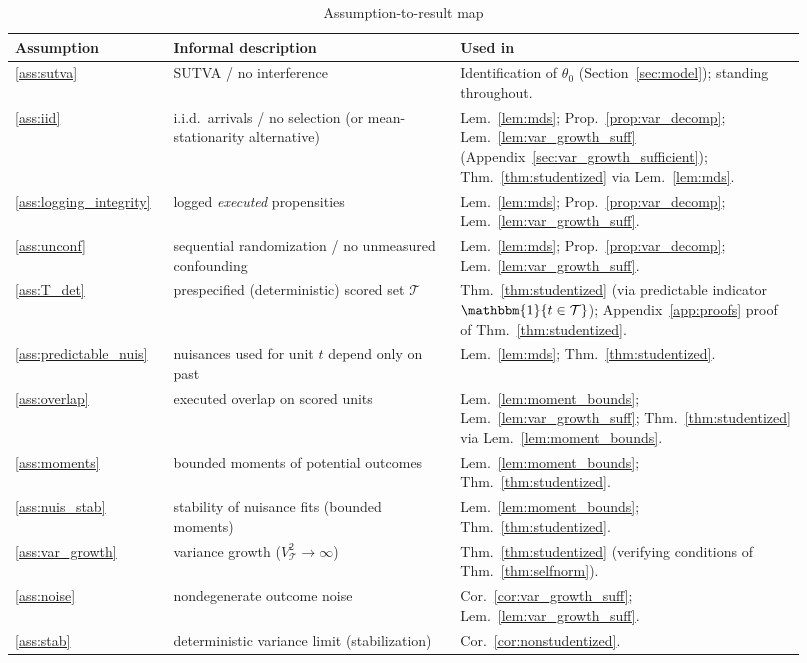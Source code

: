 \documentclass[11pt]{article}
\numberwithin{equation}{section}
\theoremstyle{plain}
\theoremstyle{definition}
\theoremstyle{remark}
\newcommand{\ind}[1]{\mathbbm{1}\{#1\}}
\begin{document}
\begin{table}[t]
\centering
\small
\begin{tabular}{@{}p{0.17\linewidth} p{0.34\linewidth} p{0.41\linewidth}@{}}
\toprule
Assumption & Informal description & Used in \\
\midrule
\ref{ass:sutva} & SUTVA / no interference & Identification of $\theta_0$ (Section~\ref{sec:model}); standing throughout. \\
\ref{ass:iid} & i.i.d.\ arrivals / no selection (or mean-stationarity alternative) & Lem.~\ref{lem:mds}; Prop.~\ref{prop:var_decomp}; Lem.~\ref{lem:var_growth_suff} (Appendix~\ref{sec:var_growth_sufficient}); Thm.~\ref{thm:studentized} via Lem.~\ref{lem:mds}. \\
\ref{ass:logging_integrity} & logged \emph{executed} propensities & Lem.~\ref{lem:mds}; Prop.~\ref{prop:var_decomp}; Lem.~\ref{lem:var_growth_suff}. \\
\ref{ass:unconf} & sequential randomization / no unmeasured confounding & Lem.~\ref{lem:mds}; Prop.~\ref{prop:var_decomp}; Lem.~\ref{lem:var_growth_suff}. \\
\ref{ass:T_det} & prespecified (deterministic) scored set $\mathcal{T}$ & Thm.~\ref{thm:studentized} (via predictable indicator $\ind{t\in\mathcal{T}}$); Appendix~\ref{app:proofs} proof of Thm.~\ref{thm:studentized}. \\
\ref{ass:predictable_nuis} & nuisances used for unit $t$ depend only on past & Lem.~\ref{lem:mds}; Thm.~\ref{thm:studentized}. \\
\ref{ass:overlap} & executed overlap on scored units & Lem.~\ref{lem:moment_bounds}; Lem.~\ref{lem:var_growth_suff}; Thm.~\ref{thm:studentized} via Lem.~\ref{lem:moment_bounds}. \\
\ref{ass:moments} & bounded moments of potential outcomes & Lem.~\ref{lem:moment_bounds}; Thm.~\ref{thm:studentized}. \\
\ref{ass:nuis_stab} & stability of nuisance fits (bounded moments) & Lem.~\ref{lem:moment_bounds}; Thm.~\ref{thm:studentized}. \\
\ref{ass:var_growth} & variance growth ($V_{\mathcal{T}}^2\to\infty$) & Thm.~\ref{thm:studentized} (verifying conditions of Thm.~\ref{thm:selfnorm}). \\
\ref{ass:noise} & nondegenerate outcome noise & Cor.~\ref{cor:var_growth_suff}; Lem.~\ref{lem:var_growth_suff}. \\
\ref{ass:stab} & deterministic variance limit (stabilization) & Cor.~\ref{cor:nonstudentized}. \\
\bottomrule
\end{tabular}
\caption{Assumption-to-result map}\label{tab:assumption_ledger}
\end{table}
\end{document}
